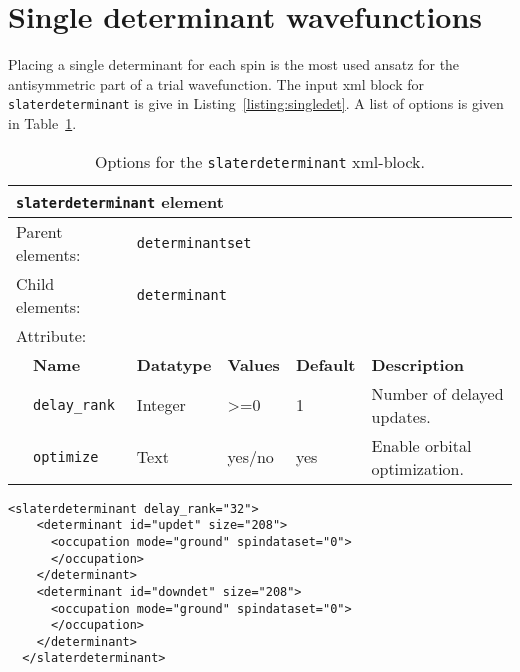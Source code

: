 \section{Single determinant wavefunctions}
\label{sec:singledeterminant}
Placing a single determinant for each spin is the most used ansatz for the antisymmetric part of a trial wavefunction.
The input xml block for \texttt{slaterdeterminant} is give in Listing~\ref{listing:singledet}. A list of options is given in
Table~\ref{table:singledet}.

\begin{table}[h]
\begin{center}
\begin{tabularx}{\textwidth}{l l l l l X }
\hline
\multicolumn{6}{l}{\texttt{slaterdeterminant} element} \\
\hline
\multicolumn{2}{l}{Parent elements:} & \multicolumn{4}{l}{\texttt{determinantset}}\\
\multicolumn{2}{l}{Child  elements:} & \multicolumn{4}{l}{\texttt{determinant}}\\
\multicolumn{2}{l}{Attribute:} & \multicolumn{4}{l}{}\\
   &   \bfseries Name       & \bfseries Datatype & \bfseries Values & \bfseries Default & \bfseries Description \\
   &   \texttt{delay\_rank} &  Integer           &  >=0             & 1           &  Number of delayed updates. \\
   &   \texttt{optimize}    &  Text              &  yes/no          & yes         &  Enable orbital optimization. \\
  \hline
\end{tabularx}
\end{center}
\caption{Options for the \texttt{slaterdeterminant} xml-block.}
\label{table:singledet}
\end{table}

\begin{lstlisting}[style=QMCPXML,caption=Slaterdeterminant set XML element.\label{listing:singledet}]
  <slaterdeterminant delay_rank="32">
    <determinant id="updet" size="208">
      <occupation mode="ground" spindataset="0">
      </occupation>
    </determinant>
    <determinant id="downdet" size="208">
      <occupation mode="ground" spindataset="0">
      </occupation>
    </determinant>
  </slaterdeterminant>
\end{lstlisting}

